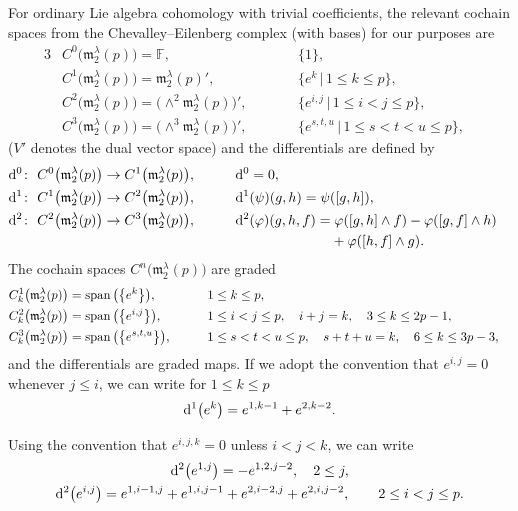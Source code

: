 \documentclass[pdftex]{sigma}
\def\spn{\mathop{\rm span}}
\def\phi{\varphi}
\def\m{\mathfrak m}
\def\F{\mathbb F}
\numberwithin{equation}{section}
\begin{document}
For ordinary Lie algebra cohomology with trivial coefficients, the relevant cochain spaces from the Chevalley--Eilenberg complex (with bases) for our purposes are
\begin{alignat*}{3}
& C^0\big(\m_2^\lambda(p)\big)= \F, \qquad && \{1\},&\\
& C^1\big(\m_2^\lambda(p)\big)= \m_2^\lambda(p)', \qquad && \big\{e^k\, |\, 1\le k\le p\big\},&\\
& C^2\big(\m_2^\lambda(p)\big)= \big({\wedge}^2\m_2^\lambda(p)\big)',\qquad && \big\{e^{i,j}\, |\, 1\le i<j\le p\big\},&\\
& C^3\big(\m_2^\lambda(p)\big)= \big({\wedge}^3\m_2^\lambda(p)\big)', \qquad && \big\{e^{s,t,u}\, |\, 1\le s<t<u\le p\big\},&
\end{alignat*}
($V'$ denotes the dual vector space) and the differentials are defined by
\begin{alignat*}{3}
& {\rm d}^0\colon \ C^0\big(\m_2^\lambda(p)\big)\to C^1\big(\m_2^\lambda(p)\big), \qquad && {\rm d}^0=0,&\\
& {\rm d}^1\colon \ C^1\big(\m_2^\lambda(p)\big)\to C^2\big(\m_2^\lambda(p)\big), \qquad && {\rm d}^1(\psi)(g,h)=\psi([g,h]),&\\
& {\rm d}^2\colon \ C^2\big(\m_2^\lambda(p)\big)\to C^3\big(\m_2^\lambda(p)\big), \qquad && {\rm d}^2(\phi)(g,h,f)=\phi([g,h]\wedge f)-\phi([g,f]\wedge h)&\\
&&& \hphantom{{\rm d}^2(\phi)(g,h,f)=}{} +\phi([h,f]\wedge g).&
\end{alignat*}
The cochain spaces $C^n\big(\m_2^\lambda(p)\big)$ are graded
\begin{alignat*}{3}
& C^1_k\big(\m_2^\lambda(p)\big)=\spn\big(\big\{e^k\big\}\big),\qquad && 1\le k\le p, &\\
& C^2_k\big(\m_2^\lambda(p)\big)=\spn\big(\big\{e^{i,j}\big\}\big),\qquad && 1\le i<j \le p,\quad i+j=k, \quad 3\le k\le 2p-1, &\\
& C^3_k\big(\m_2^\lambda(p)\big)=\spn\big(\big\{e^{s,t,u}\big\}\big),\qquad && 1\le s<t<u \le p, \quad s+t+u=k, \quad 6\le k\le 3p-3,&
\end{alignat*}
and the differentials are graded maps. If we adopt the convention that $e^{i,j}=0$ whenever $j\le i$, we can write for $1\le k\le p$
\begin{gather}\label{1-coboundary}
 {\rm d}^1\big(e^k\big)=e^{1,k-1}+e^{2,k-2}.
\end{gather}

Using the convention that $e^{i,j,k}=0$ unless $i<j<k$, we can write
\begin{gather}
 {\rm d}^2\big(e^{1,j}\big) = -e^{1,2,j-2}, \quad 2\le j,\nonumber\\
 {\rm d}^2\big(e^{i,j}\big) =e^{1,i-1,j}+e^{1,i,j-1}+e^{2,i-2,j}+e^{2,i,j-2}, \qquad 2\le i<j\le p. \label{2-coboundary}
\end{gather}
\end{document}
